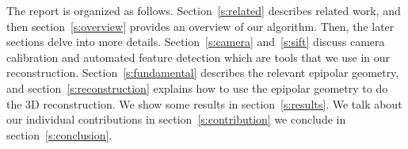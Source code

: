 The report is organized as follows. Section~\ref{s:related} describes related work, and then section~\ref{s:overview} provides an overview of our algorithm. Then, the later sections delve into more details. Section~\ref{s:camera} and~\ref{s:sift} discuss camera calibration and automated feature detection which are tools that we use in our reconstruction. Section~\ref{s:fundamental} describes the relevant epipolar geometry, and section~\ref{s:reconstruction} explains how to use the epipolar geometry to do the 3D reconstruction. We show some results in section~\ref{s:results}. We talk about our individual contributions in section~\ref{s:contribution} we conclude in section~\ref{s:conclusion}.

